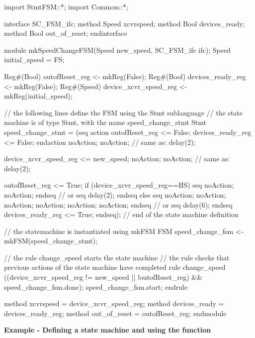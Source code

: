 \begin{libverbatim}
import StmtFSM::*;
import Common::*;

interface SC_FSM_ifc;
   method Speed xcvrspeed;
   method Bool  devices_ready;
   method Bool  out_of_reset;
endinterface

module mkSpeedChangeFSM(Speed new_speed, SC_FSM_ifc ifc);
   Speed initial_speed = FS;
   
   Reg#(Bool) outofReset_reg <- mkReg(False);
   Reg#(Bool) devices_ready_reg <- mkReg(False);
   Reg#(Speed) device_xcvr_speed_reg <- mkReg(initial_speed);
   
   // the following lines define the FSM using the Stmt sublanguage
   // the state machine is of type Stmt, with the name speed_change_stmt
   Stmt speed_change_stmt =
   (seq
       action outofReset_reg <= False; devices_ready_reg <= False; endaction
       noAction; noAction;  // same as: delay(2);
       
       device_xcvr_speed_reg <= new_speed;
       noAction; noAction;  // same as: delay(2);
       
       outofReset_reg <= True;
       if (device_xcvr_speed_reg==HS)
          seq noAction; noAction; endseq
          // or seq delay(2); endseq
       else
          seq noAction; noAction; noAction; noAction; noAction; noAction; endseq          
         // or seq delay(6); endseq
       devices_ready_reg <= True;
    endseq);
   // end of the state machine definition

   // the statemachine is instantiated using mkFSM
   FSM speed_change_fsm <- mkFSM(speed_change_stmt);
   
   // the rule change_speed starts the state machine
   // the rule checks that previous actions of the state machine have completed
   rule change_speed ((device_xcvr_speed_reg != new_speed || !outofReset_reg) &&
		      speed_change_fsm.done);
      speed_change_fsm.start;
   endrule

   method xcvrspeed = device_xcvr_speed_reg;
   method devices_ready = devices_ready_reg;
   method out_of_reset = outofReset_reg;
endmodule
\end{libverbatim}

{\bf Example - Defining a state machine and using the  function} 

